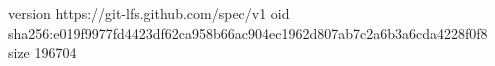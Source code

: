version https://git-lfs.github.com/spec/v1
oid sha256:e019f9977fd4423df62ca958b66ac904ec1962d807ab7c2a6b3a6cda4228f0f8
size 196704
